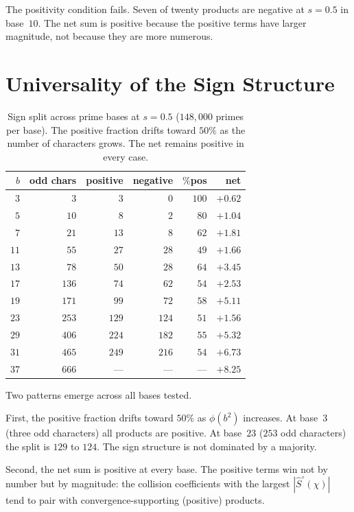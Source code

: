 \documentclass[12pt]{amsart}
\theoremstyle{definition}
\theoremstyle{remark}
\begin{document}
The positivity condition fails. Seven of twenty products
are negative at $s = 0.5$ in base~$10$. The net sum is
positive because the positive terms have larger
magnitude, not because they are more numerous.

\section{Universality of the Sign Structure}

\begin{table}[h]
\centering
\begin{tabular}{rrrrrr}
\toprule
$b$ & odd chars & positive & negative & $\%$pos &
net \\
\midrule
$3$ & $3$ & $3$ & $0$ & $100$ & $+0.62$ \\
$5$ & $10$ & $8$ & $2$ & $80$ & $+1.04$ \\
$7$ & $21$ & $13$ & $8$ & $62$ & $+1.81$ \\
$11$ & $55$ & $27$ & $28$ & $49$ & $+1.66$ \\
$13$ & $78$ & $50$ & $28$ & $64$ & $+3.45$ \\
$17$ & $136$ & $74$ & $62$ & $54$ & $+2.53$ \\
$19$ & $171$ & $99$ & $72$ & $58$ & $+5.11$ \\
$23$ & $253$ & $129$ & $124$ & $51$ & $+1.56$ \\
$29$ & $406$ & $224$ & $182$ & $55$ & $+5.32$ \\
$31$ & $465$ & $249$ & $216$ & $54$ & $+6.73$ \\
$37$ & $666$ & --- & --- & --- & $+8.25$ \\
\bottomrule
\end{tabular}
\caption{Sign split across prime bases at $s = 0.5$
($148{,}000$ primes per base). The positive fraction
drifts toward $50\%$ as the number of characters
grows. The net remains positive in every case.}
\label{tab:multi}
\end{table}

Two patterns emerge across all bases tested.

First, the positive fraction drifts toward $50\%$ as
$\phi(b^2)$ increases. At base~$3$ (three odd
characters) all products are positive. At base~$23$
($253$ odd characters) the split is $129$ to $124$.
The sign structure is not dominated by a majority.

Second, the net sum is positive at every base. The
positive terms win not by number but by magnitude:
the collision coefficients with the largest
$|\hat{S}^{\circ}(\chi)|$ tend to pair with
convergence-supporting (positive) products.
\end{document}
